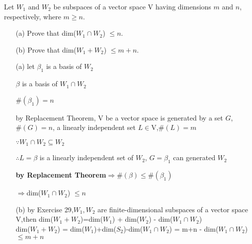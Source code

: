 Let $W_1$ and $W_2$ be subspaces of a vector space V having dimensions $m$ and $n$, respectively, where $m \geq n$.

\begin{enumerate}
	\item[(a)] Prove that dim($W_1 \cap W_2$) $\leq n$.
	\item[(b)] Prove that dim($W_1 + W_2$) $\leq m+n$.
\end{enumerate}

\begin{tcolorbox}
	\begin{solution}
		\begin{enumerate}
			\item[(a)] let $\beta_1$ is a basis of $W_2$
			
			$\beta$ is a basis of $W_1 \cap W_2$
			
			$\#(\beta_1) = n$
			
			by Replacement Theorem, V be a vector space is generated by a set $G$, $\#(G)=n$, a linearly independent set $L \in \mathrm{V}$,$\#(L) = m$
			
			$\because W_1 \cap W_2 \subseteq W_2$
			
			$\therefore L = \beta$ is a linearly independent set of $W_2$, $G = \beta_1$ can generated $W_2$
			
			\textbf{by Replacement Theorem}$\Rightarrow \#(\beta) \leq \#(\beta_1)$
			
			$\Rightarrow $dim($W_1 \cap W_2$) $\leq n$
			
			\item[(b)] by Exercise 29,$W_1,W_2$ are finite-dimensional subspaces of a vector space V,then dim($W_1 + W_2$)=dim($W_1$) + dim($W_2$) - dim($W_1 \cap W_2$)\\
			dim($W_1 + W_2$) = dim($W_1$)+dim($S_2$)-dim($W_1 \cap W_2$) = m+n - dim($W_1 \cap W_2$) $\leq m+n$
		\end{enumerate}
	\end{solution}
\end{tcolorbox}